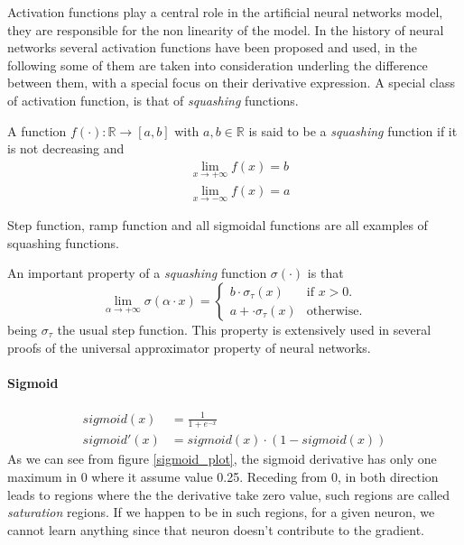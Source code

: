 Activation functions play a central role in the artificial neural networks model, they are responsible for the non linearity of the model.
In the history of neural networks several activation functions have been proposed and used, in the following some of them are taken into consideration
underling the difference between them, with a special focus on their derivative expression.
A special class of activation function, is that of \textit{squashing} functions.

\begin{defn}
A function $f(\cdot):\mathbb{R}\rightarrow[a,b]$ with $a,b \in \mathbb{R}$ is said to be a \textit{squashing} function if it is not decreasing and 
\begin{align}
&\lim_{x \to +\infty} f(x) = b \\
&\lim_{x \to -\infty} f(x) = a 
\end{align}
\end{defn}
Step function, ramp function and all sigmoidal functions are all examples of squashing functions.

\begin{remark}
An important property of a \textit{squashing} function $\sigma(\cdot)$ is that
\begin{equation}
 \lim_{\alpha \to +\infty} \sigma(\alpha\cdot x)= 
 \begin{cases}
    b \cdot \sigma_{\tau}(x) & \text{if $x>0$}.\\
    a + \cdot \sigma_{\tau}(x) & \text{otherwise}.
  \end{cases}
\end{equation}
being $\sigma_{\tau}$ the usual step function.
This property is extensively used in several proofs of the universal approximator property of neural networks.
\end{remark}


\paragraph{Sigmoid}

\begin{align}
sigmoid(x)&= \frac{1}{1+e^{-x}}  \\ 
sigmoid'(x)&= sigmoid(x) \cdot (1-sigmoid(x))
\end{align}
As we can see from figure \ref{sigmoid_plot}, the sigmoid derivative has only one maximum in 0 where it assume value 0.25. Receding from 0, in both direction leads to regions where
the the derivative take zero value, such regions are called \textit{saturation} regions. If we happen to be in such regions, for a given neuron, we cannot learn anything since that neuron doesn't contribute
to the gradient.

